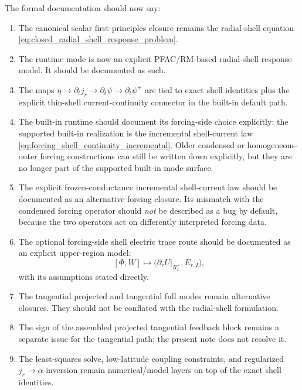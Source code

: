 \documentclass[11pt,a4paper]{article}
\begin{document}
The formal documentation should now say:
\begin{enumerate}
\item The canonical scalar first-principles closure remains the radial-shell
equation \eqref{eq:closed_radial_shell_response_problem}.

\item The runtime  mode is now an explicit PFAC/RM-based
radial-shell response model. It should be documented as such.

\item The maps
$\eta \to \partial_t j_r \to \partial_t \psi \to \partial_t\psi^+$
are tied to exact shell identities plus the explicit thin-shell
current-continuity connector in the built-in default path.

\item The built-in  runtime should document its
forcing-side choice explicitly: the supported built-in realization is the
incremental shell-current law
\eqref{eq:forcing_shell_continuity_incremental}. Older condensed or
homogeneous-outer forcing constructions can still be written down explicitly,
but they are no longer part of the supported built-in mode surface.

\item The explicit frozen-conductance incremental shell-current law should be
documented as an alternative forcing closure. Its mismatch with the condensed
forcing operator should \emph{not} be described as a bug by default, because
the two operators act on differently interpreted forcing data.

\item The optional forcing-side shell electric trace route should be documented
as an explicit upper-region model:
\[
[\Phi, W] \mapsto \bigl(\partial_r U|_{R_I^+}, E_{r,I}\bigr),
\]
with its assumptions stated directly.

\item The tangential projected and tangential full modes remain alternative
closures. They should not be conflated with the radial-shell formulation.

\item The sign of the assembled projected tangential feedback block remains a
separate issue for the tangential path; the present note does not resolve it.

\item The least-squares solve, low-latitude coupling constraints, and
regularized $j_r\to\alpha$ inversion remain numerical/model layers on top of
the exact shell identities.
\end{enumerate}
\end{document}
